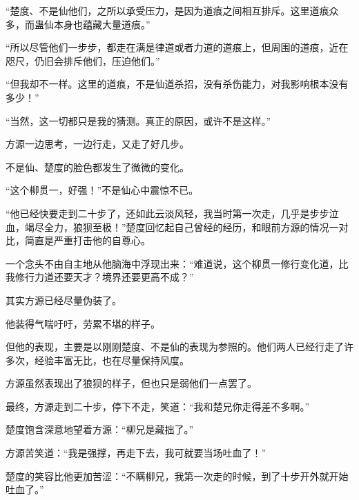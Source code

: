 \begin{this_body}
“楚度、不是仙他们，之所以承受压力，是因为道痕之间相互排斥。这里道痕众多，而蛊仙本身也蕴藏大量道痕。”

“所以尽管他们一步步，都走在满是律道或者力道的道痕上，但周围的道痕，近在咫尺，仍旧会排斥他们，压迫他们。”

“但我却不一样。这里的道痕，不是仙道杀招，没有杀伤能力，对我影响根本没有多少！”

“当然，这一切都只是我的猜测。真正的原因，或许不是这样。”

方源一边思考，一边行走，又走了好几步。

不是仙、楚度的脸色都发生了微微的变化。

“这个柳贯一，好强！”不是仙心中震惊不已。

“他已经快要走到二十步了，还如此云淡风轻，我当时第一次走，几乎是步步泣血，竭尽全力，狼狈至极！”楚度回忆起自己曾经的经历，和眼前方源的情况一对比，简直是严重打击他的自尊心。

一个念头不由自主地从他脑海中浮现出来：“难道说，这个柳贯一修行变化道，比我修行力道还要天才？境界还要更高不成？”

其实方源已经尽量伪装了。

他装得气喘吁吁，劳累不堪的样子。

但他的表现，主要是以刚刚楚度、不是仙的表现为参照的。他们两人已经行走了许多次，经验丰富无比，也在尽量保持风度。

方源虽然表现出了狼狈的样子，但也只是弱他们一点罢了。

最终，方源走到二十步，停下不走，笑道：“我和楚兄你走得差不多啊。”

楚度饱含深意地望着方源：“柳兄是藏拙了。”

方源苦笑道：“我是强撑，再走下去，我可就要当场吐血了！”

楚度的笑容比他更加苦涩：“不瞒柳兄，我第一次走的时候，到了十步开外就开始吐血了。”

\end{this_body}

